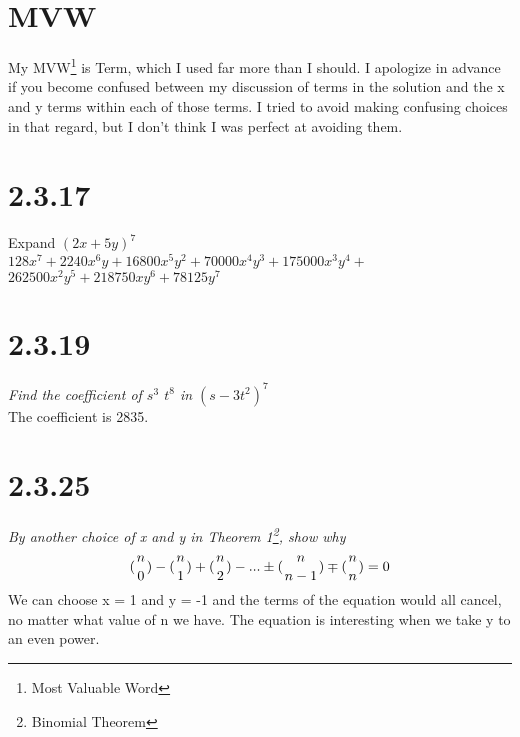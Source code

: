 \documentclass[11pt]{article} %
\newcommand\tab[1][1cm]{\hspace*{#1}}
\begin{document}
\section* {MVW}
My MVW\footnote{Most Valuable Word} is Term, which I used far more than I should. I apologize in advance if you become confused between my discussion of terms in the solution and the x and y terms within each of those terms. I tried to avoid making confusing choices in that regard, but I don't think I was perfect at avoiding them. 
 
 \newpage

\section* {2.3.17}
Expand $(2x + 5y)^7$
\\ \tab $128 x^7+2240 x^6 y+16800 x^5 y^2+70000 x^4 y^3+175000 x^3 y^4+$
\\ \tab \tab $262500 x^2 y^5 + 218750 x y^6+78125 y^7$
\section* {2.3.19}
\textit{Find the coefficient of $s^3$ $t^8$ in $(s - 3t^2)^7$}
\\ \tab The coefficient is 2835. 

\section* {2.3.25}
\textit{By another choice of x and y in Theorem 1\footnote{Binomial Theorem}, show why}
\begin{equation}
({n\atop 0}) - ({n\atop 1}) + ({n\atop 2}) - ... \pm ({n\atop n-1}) \mp ({n\atop n}) = 0
\end{equation}
\tab We can choose x = 1 and y = -1 and the terms of the equation would all cancel, no matter what value of n we have. The equation is interesting when we take y to an even power. 
\end{document}

